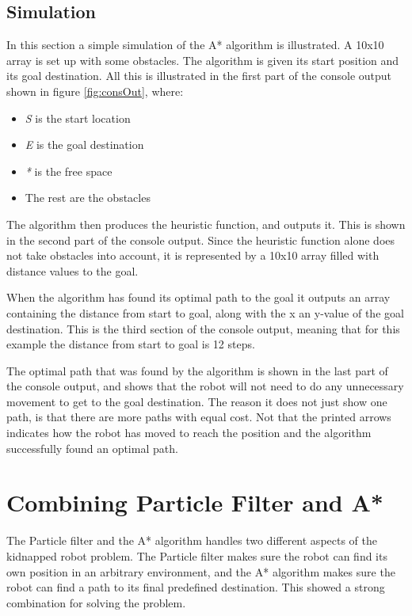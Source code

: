 \subsection{Simulation}
In this section a simple simulation of the A* algorithm is illustrated. A 10x10 array is set up with some obstacles. The algorithm is given its start position and its goal destination. All this is illustrated in the first part of the console output shown in figure \ref{fig:consOut}, where:

\begin{itemize}
	\item \emph{S} is the start location
	\item \emph{E} is the goal destination
	\item \emph{*} is the free space
	\item The rest are the obstacles
\end{itemize}

The algorithm then produces the heuristic function, and outputs it. This is shown in the second part of the console output. Since the heuristic function alone does not take obstacles into account, it is represented by a 10x10 array filled with distance values to the goal. 

When the algorithm has found its optimal path to the goal it outputs an array containing the distance from start to goal, along with the x an y-value of the goal destination. This is the third section of the console output, meaning that for this example the distance from start to goal is 12 steps. 

The optimal path that was found by the algorithm is shown in the last part of the console output, and shows that the robot will not need to do any unnecessary movement to get to the goal destination. The reason it does not just show one path, is that there are more paths with equal cost. Not that the printed arrows indicates how the robot has moved to reach the position and the algorithm successfully found an optimal path.


\section{Combining Particle Filter and A*}

The Particle filter and the A* algorithm handles two different aspects of the kidnapped robot problem. The Particle filter makes sure the robot can find its own position in an arbitrary environment, and the A* algorithm makes sure the robot can find a path to its final predefined destination. This showed a strong combination for solving the problem.


